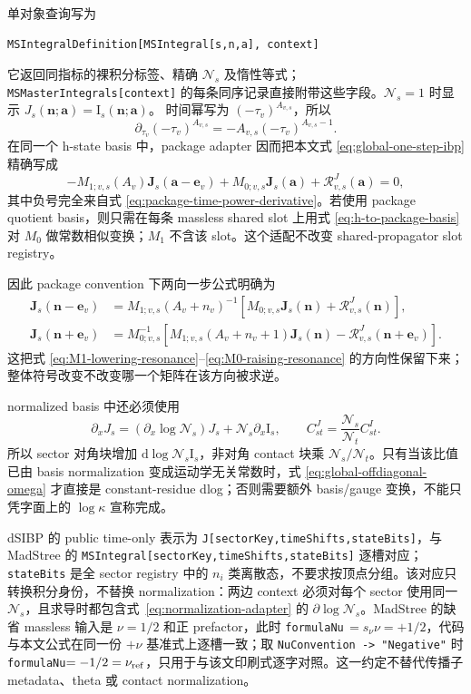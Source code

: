 \documentclass[11pt,a4paper]{ctexart}
\newcommand{\dd}{\mathrm d}
\newcommand{\cR}{\mathcal R}
\newcommand{\cN}{\mathcal N}
\begin{document}
单对象查询写为
\begin{verbatim}
MSIntegralDefinition[MSIntegral[s,n,a], context]
\end{verbatim}
它返回同指标的裸积分标签、精确 $\cN_s$ 及惰性等式；
\texttt{MSMasterIntegrals[context]} 的每条同序记录直接附带这些字段。$\cN_s=1$ 时显示
$J_s(\bm n;\bm a)=\text{I}_s(\bm n;\bm a)$。
时间幂写为 $(-\tau_v)^{A_{v,s}}$，所以
\begin{equation}
 \partial_{\tau_v}(-\tau_v)^{A_{v,s}}
 =-A_{v,s}(-\tau_v)^{A_{v,s}-1}.
 \label{eq:package-time-power-derivative}
\end{equation}
在同一个 h-state basis 中，package adapter 因而把本文式 \eqref{eq:global-one-step-ibp} 精确写成
\begin{equation}
 -M_{1;v,s}(A_v)\bm J_s(\bm a-\bm e_v)
 +M_{0;v,s}\bm J_s(\bm a)
 +\cR^{J}_{v,s}(\bm a)=0,
 \label{eq:package-one-step-ibp}
\end{equation}
其中负号完全来自式 \eqref{eq:package-time-power-derivative}。若使用 package quotient basis，则只需在每条 massless shared slot 上用式 \eqref{eq:h-to-package-basis} 对 $M_0$ 做常数相似变换；$M_1$ 不含该 slot。这个适配不改变 shared-propagator slot registry。

因此 package convention 下两向一步公式明确为
\begin{align}
 \bm J_s(\bm n-\bm e_v)
 &=M_{1;v,s}(A_v+n_v)^{-1}
 \left[M_{0;v,s}\bm J_s(\bm n)+\cR^J_{v,s}(\bm n)\right],
 \label{eq:package-lowering}\\
 \bm J_s(\bm n+\bm e_v)
 &=M_{0;v,s}^{-1}
 \left[M_{1;v,s}(A_v+n_v+1)\bm J_s(\bm n)
 -\cR^J_{v,s}(\bm n+\bm e_v)\right].
 \label{eq:package-raising}
\end{align}
这把式 \eqref{eq:M1-lowering-resonance}--\eqref{eq:M0-raising-resonance} 的方向性保留下来；整体符号改变不改变哪一个矩阵在该方向被求逆。

normalized basis 中还必须使用
\begin{equation}
 \partial_xJ_s
 =(\partial_x\log\cN_s)J_s+\cN_s\partial_x\text{I}_s,
 \qquad
 C^{J}_{st}=\frac{\cN_s}{\cN_t}C^{I}_{st}.
 \label{eq:normalization-adapter}
\end{equation}
所以 sector 对角块增加 $\dd\log\cN_s\text{I}_s$，非对角 contact 块乘 $\cN_s/\cN_t$。只有当该比值已由 basis normalization 变成运动学无关常数时，式 \eqref{eq:global-offdiagonal-omega} 才直接是 constant-residue dlog；否则需要额外 basis/gauge 变换，不能只凭字面上的 $\log\kappa$ 宣称完成。

dSIBP 的 public time-only 表示为 \texttt{J[sectorKey,timeShifts,stateBits]}，与 MadStree 的 \texttt{MSIntegral[sectorKey,timeShifts,stateBits]} 逐槽对应；\texttt{stateBits} 是全 sector registry 中的 $n_i$ 类离散态，不要求按顶点分组。该对应只转换积分身份，不替换 normalization：两边 context 必须对每个 sector 使用同一 $\cN_s$，且求导时都包含式~\eqref{eq:normalization-adapter} 的 $\partial\log\cN_s$。MadStree 的缺省 massless 输入是 $\nu=1/2$ 和正 prefactor，此时 \texttt{formulaNu}$\,=s_\nu\nu=+1/2$，代码与本文公式在同一份 $+\nu$ 基准式上逐槽一致；取 \texttt{NuConvention -> "Negative"} 时 \texttt{formulaNu}$=-1/2=\nu_{\rm ref}$，只用于与该文印刷式逐字对照。这一约定不替代传播子 metadata、theta 或 contact normalization。
\end{document}
